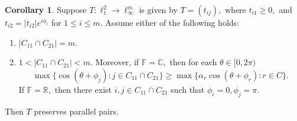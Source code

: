 \documentclass{amsart}
\theoremstyle{definition}
\newtheorem{cor}[theorem]{Corollary}
\theoremstyle{remark}
\numberwithin{equation}{section}
\begin{document}
%
\begin{cor}\label{cor-03}
	Suppose $T:\ell_1^2\to \ell_\infty^m$ is given by $T=(t_{ij}),$ where $t_{i1}\geq 0,$ and $t_{i2}=|t_{i2}|e^{i\phi_i}$ for $1\leq i\leq m.$ 	Assume either of the following holds:
	\begin{enumerate}
		\item $|C_{11}\cap C_{21}|=m.$ 
		\item $1<|C_{11}\cap C_{21}|<m.$ Moreover, if $\mathbb{F}=\mathbb{C},$ then for each  $\theta\in [0,2\pi)$
		\begin{equation}\label{eq-gen}
			\max\{\cos(\theta+\phi_j):j\in C_{11}\cap C_{21}\} \geq \max\Big\{\alpha_r\cos(\theta+\phi_r):r\in C \Big\}.	
		\end{equation}	
	If $\mathbb{F}=\mathbb{R},$ then  there exist $i,j\in C_{11}\cap C_{21}$ such that $\phi_i=0,\phi_j=\pi.$
	\end{enumerate}
%	
Then $T$ preserves parallel pairs.
\end{cor}
\end{document}
